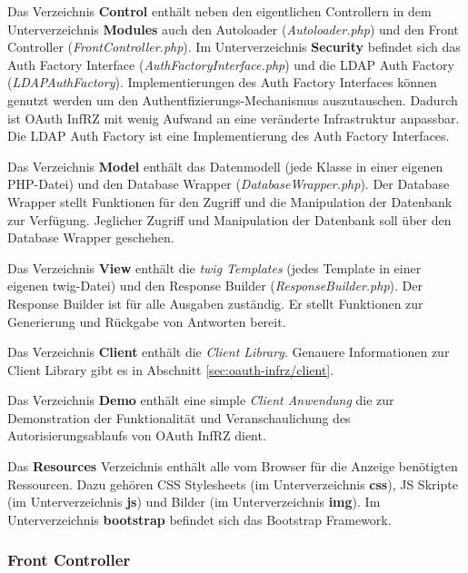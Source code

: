 \documentclass[12pt,a4paper,pointednumbers,abstracton]{scrartcl}
\begin{document}
Das Verzeichnis \textbf{Control} enthält neben den eigentlichen Controllern in dem Unterverzeichnis \textbf{Modules} auch den Autoloader (\emph{Autoloader.php}) und den Front Controller (\emph{FrontController.php}).
Im Unterverzeichnis \textbf{Security} befindet sich das Auth Factory Interface (\emph{AuthFactoryInterface.php}) und die LDAP Auth Factory (\emph{LDAPAuthFactory}).
Implementierungen des Auth Factory Interfaces können genutzt werden um den Authentfizierungs-Mechanismus auszutauschen.
Dadurch ist OAuth InfRZ mit wenig Aufwand an eine veränderte Infrastruktur anpassbar.
Die LDAP Auth Factory ist eine Implementierung des Auth Factory Interfaces.

Das Verzeichnis \textbf{Model} enthält das Datenmodell (jede Klasse in einer eigenen PHP-Datei) und den Database Wrapper (\emph{DatabaseWrapper.php}).
Der Database Wrapper stellt Funktionen für den Zugriff und die Manipulation der Datenbank zur Verfügung.
Jeglicher Zugriff und Manipulation der Datenbank soll über den Database Wrapper geschehen.

Das Verzeichnis \textbf{View} enthält die \emph{twig Templates} (jedes Template in einer eigenen twig-Datei) und den Response Builder (\emph{ResponseBuilder.php}).
Der Response Builder ist für alle Ausgaben zuständig.
Er stellt Funktionen zur Generierung und Rückgabe von Antworten bereit.

Das Verzeichnis \textbf{Client} enthält die \emph{Client Library}. Genauere Informationen zur Client Library gibt es in Abschnitt \ref{sec:oauth-infrz/client}.

Das Verzeichnis \textbf{Demo} enthält eine simple \emph{Client Anwendung} die zur Demonstration der Funktionalität und Veranschaulichung des Autorisierungsablaufs von OAuth InfRZ dient.

Das \textbf{Resources} Verzeichnis enthält alle vom Browser für die Anzeige benötigten Ressourcen. Dazu gehören CSS Stylesheets (im Unterverzeichnis \textbf{css}), JS Skripte (im Unterverzeichnis \textbf{js}) und Bilder (im Unterverzeichnis \textbf{img}). Im Unterverzeichnis \textbf{bootstrap} befindet sich das Bootstrap Framework.

\subsubsection{Front Controller}
\end{document}

